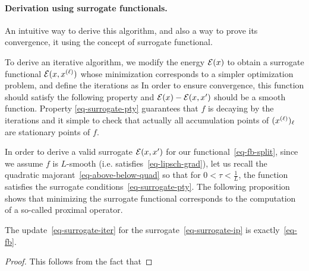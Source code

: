 \paragraph{Derivation using surrogate functionals.}

An intuitive way to derive this algorithm, and also a way to prove its convergence, it using the concept of surrogate functional.

%

To derive an iterative algorithm, we modify the energy $\Ee(x)$ to obtain a surrogate functional $\Ee(x,\it{x})$ whose minimization corresponds to a simpler optimization problem, and define the iterations as
In order to ensure convergence, this function should satisfy the following property
and $\Ee(x)-\Ee(x,x')$ should be a smooth function.
%
Property \eqref{eq-surrogate-pty} guarantees that $f$ is decaying by the iterations
and it simple to check that actually all accumulation points of $(\it{x})_\ell$ are stationary points of $f$. 

In order to derive a valid surrogate $\Ee(x,x')$ for our functional~\eqref{eq-fb-split}, since we assume $f$ is $L$-smooth (i.e. satisfies~\eqref{eq-lipsch-grad}), let us recall the quadratic majorant~\eqref{eq-above-below-quad}
so that for $0 < \tau < \frac{1}{L}$, the function 
satisfies the surrogate conditions~\eqref{eq-surrogate-pty}.
%
The following proposition shows that minimizing the surrogate functional corresponds to the computation of a so-called proximal operator. 

\begin{prop}
	The update~\eqref{eq-surrogate-iter} for the surrogate~\eqref{eq-surrogate-ip} is exactly~\eqref{eq-fb}.
\end{prop}
\begin{proof}
	This follows from the fact that
\end{proof}

